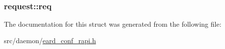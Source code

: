 \subsubsection[{\texorpdfstring{req}{req}}]{ request\+::req}\hypertarget{structrequest_a876777560756f3c5dd530a47168cae79}{}\label{structrequest_a876777560756f3c5dd530a47168cae79}


The documentation for this struct was generated from the following file\+:\begin{DoxyCompactItemize}
\item 
src/daemon/\hyperlink{eard__conf__rapi_8h}{eard\+\_\+conf\+\_\+rapi.\+h}\end{DoxyCompactItemize}
